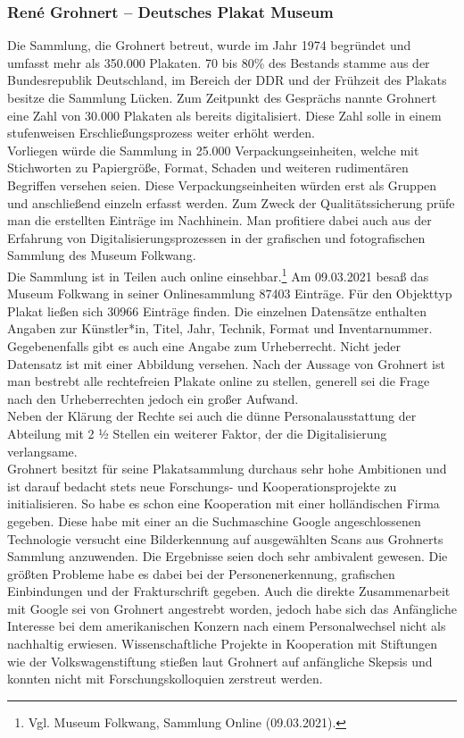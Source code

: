 \documentclass[a4paper,12pt,ngerman]{article}
\begin{document}
\subsubsection{René Grohnert -- Deutsches Plakat Museum}
Die Sammlung, die Grohnert betreut, wurde im Jahr 1974 begründet und umfasst mehr als 350.000 Plakaten. 70 bis 80\% des Bestands stamme aus der Bundesrepublik Deutschland, im Bereich der DDR und der Frühzeit des Plakats besitze die Sammlung Lücken. Zum Zeitpunkt des Gesprächs nannte Grohnert eine Zahl von 30.000 Plakaten als bereits digitalisiert. Diese Zahl solle in einem stufenweisen Erschließungsprozess weiter erhöht werden. \\
Vorliegen würde die Sammlung in 25.000 Verpackungseinheiten, welche mit Stichworten zu Papiergröße, Format, Schaden und weiteren rudimentären Begriffen versehen seien. Diese Verpackungseinheiten würden erst als Gruppen und anschließend einzeln erfasst werden. Zum Zweck der Qualitätssicherung prüfe man die erstellten Einträge im Nachhinein. Man profitiere dabei auch aus der Erfahrung von Digitalisierungsprozessen in der grafischen und fotografischen Sammlung des Museum Folkwang. \\
Die Sammlung ist in Teilen auch online einsehbar.\footnote{Vgl. Museum Folkwang, Sammlung Online (09.03.2021).}  Am 09.03.2021 besaß das Museum Folkwang in seiner Onlinesammlung 87403 Einträge. Für den Objekttyp Plakat ließen sich 30966 Einträge finden. Die einzelnen Datensätze enthalten Angaben zur Künstler*in, Titel, Jahr, Technik, Format und Inventarnummer. Gegebenenfalls gibt es auch eine Angabe zum Urheberrecht. Nicht jeder Datensatz ist mit einer Abbildung versehen. Nach der Aussage von Grohnert ist man bestrebt alle rechtefreien Plakate online zu stellen, generell sei die Frage nach den Urheberrechten jedoch ein großer Aufwand. \\
Neben der Klärung der Rechte sei auch die dünne Personalausstattung der Abteilung mit 2 ½ Stellen ein weiterer Faktor, der die Digitalisierung verlangsame. \\
Grohnert besitzt für seine Plakatsammlung durchaus sehr hohe Ambitionen und ist darauf bedacht stets neue Forschungs- und Kooperationsprojekte zu initialisieren. So habe es schon eine Kooperation mit einer holländischen Firma gegeben. Diese habe mit einer an die Suchmaschine Google angeschlossenen Technologie versucht eine Bilderkennung auf ausgewählten Scans aus Grohnerts Sammlung anzuwenden. Die Ergebnisse seien doch sehr ambivalent gewesen. Die größten Probleme habe es dabei bei der Personenerkennung, grafischen Einbindungen und der Frakturschrift gegeben. Auch die direkte Zusammenarbeit mit Google sei von Grohnert angestrebt worden, jedoch habe sich das Anfängliche Interesse bei dem amerikanischen Konzern nach einem Personalwechsel nicht als nachhaltig erwiesen. Wissenschaftliche Projekte in Kooperation mit Stiftungen wie der Volkswagenstiftung stießen laut Grohnert auf anfängliche Skepsis und konnten nicht mit Forschungskolloquien zerstreut werden. \\
\end{document}
